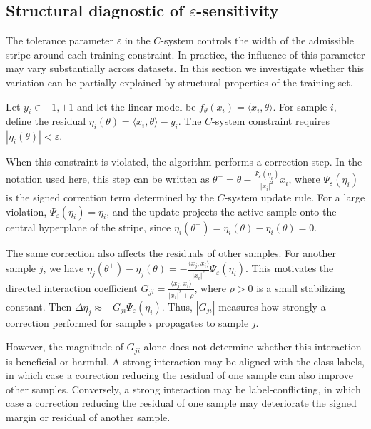 \documentclass[a4paper,fleqn]{cas-sc}
\begin{document}
\subsection{Structural diagnostic of \texorpdfstring{$\varepsilon$}{epsilon}-sensitivity}
\label{subsec:structural-eps-diagnostic}

The tolerance parameter $\varepsilon$ in the $C$-system controls the width of the admissible stripe around each training constraint. In practice, the influence of this parameter may vary substantially across datasets. In this section we investigate whether this variation can be partially explained by structural properties of the training set.

Let $y_i\in{-1,+1}$ and let the linear model be $f_\theta(x_i)=\langle x_i,\theta\rangle$. For sample $i$, define the residual $\eta_i(\theta)=\langle x_i,\theta\rangle-y_i$. The $C$-system constraint requires $|\eta_i(\theta)|<\varepsilon$.

When this constraint is violated, the algorithm performs a correction step. In the notation used here, this step can be written as $\theta^{+}=\theta-\frac{\Psi_\varepsilon(\eta_i)}{|x_i|^2}x_i$, where $\Psi_\varepsilon(\eta_i)$ is the signed correction term determined by the $C$-system update rule. For a large violation, $\Psi_\varepsilon(\eta_i)=\eta_i$, and the update projects the active sample onto the central hyperplane of the stripe, since $\eta_i(\theta^{+})=\eta_i(\theta)-\eta_i(\theta)=0$.

The same correction also affects the residuals of other samples. For another sample $j$, we have $\eta_j(\theta^{+})-\eta_j(\theta)=-\frac{\langle x_j,x_i\rangle}{|x_i|^2}\Psi_\varepsilon(\eta_i)$. This motivates the directed interaction coefficient $G_{ji}=\frac{\langle x_j,x_i\rangle}{|x_i|^2+\rho}$, where $\rho>0$ is a small stabilizing constant. Then $\Delta \eta_j\approx -G_{ji}\Psi_\varepsilon(\eta_i)$. Thus, $|G_{ji}|$ measures how strongly a correction performed for sample $i$ propagates to sample $j$.

However, the magnitude of $G_{ji}$ alone does not determine whether this interaction is beneficial or harmful. A strong interaction may be aligned with the class labels, in which case a correction reducing the residual of one sample can also improve other samples. Conversely, a strong interaction may be label-conflicting, in which case a correction reducing the residual of one sample may deteriorate the signed margin or residual of another sample.
\end{document}
